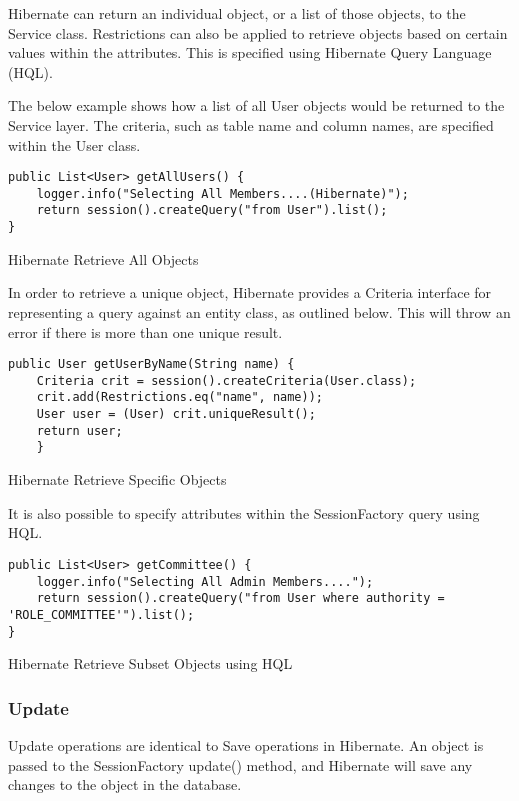 Hibernate can return an individual object, or a list of those objects, to the Service class. Restrictions can also be applied to retrieve objects based on certain values within the attributes. This is specified using Hibernate Query Language (HQL).

The below example shows how a list of all User objects would be returned to the Service layer. The criteria, such as table name and column names, are specified within the User class. 

\begin{table}[H]
\begin{lstlisting}
public List<User> getAllUsers() {
	logger.info("Selecting All Members....(Hibernate)");
	return session().createQuery("from User").list();
}
\end{lstlisting}
\caption{Hibernate Retrieve All Objects }
\end{table}

In order to retrieve a unique object, Hibernate provides a Criteria interface for representing a query against an entity class, as outlined below. This will throw an error if there is more than one unique result. 

\begin{table}[H]
\begin{lstlisting}
public User getUserByName(String name) {
	Criteria crit = session().createCriteria(User.class);
	crit.add(Restrictions.eq("name", name)); 
	User user = (User) crit.uniqueResult();
	return user;
	}
\end{lstlisting}
\caption{Hibernate Retrieve Specific Objects }
\end{table}

It is also possible to specify attributes within the SessionFactory query using HQL. 

\begin{table}[H]
\begin{lstlisting}
public List<User> getCommittee() {
	logger.info("Selecting All Admin Members....");
	return session().createQuery("from User where authority = 'ROLE_COMMITTEE'").list();
}
\end{lstlisting}
\caption{Hibernate Retrieve Subset Objects using HQL }
\end{table}

\subsubsection{Update}

Update operations are identical to Save operations in Hibernate. An object is passed to the SessionFactory update() method, and Hibernate will save any changes to the object in the database.

